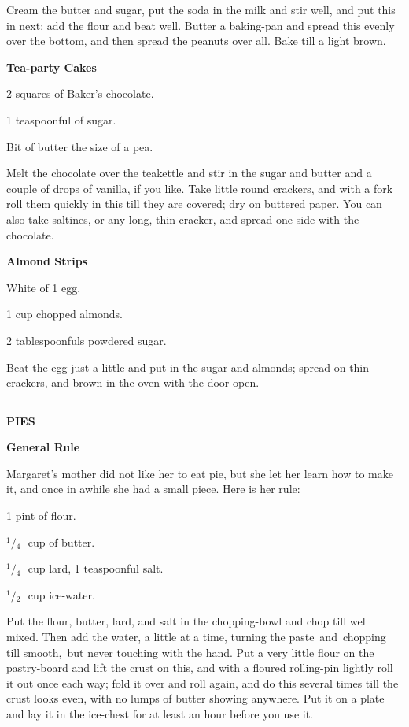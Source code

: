 \documentclass[11pt]{book}
\newcommand{\hstroke}{\rule[0.5ex]{5.0em}{0.2ex}}
\newcommand{\indpar}{\par\noindent\hspace*{\parindent}}
\newcommand{\ingredient}{\indpar}
\newcommand{\instruction}{\indpar}
\newcommand{\OneHalf}{\ensuremath{{}^1\!\!/\!{}_2\mbox{\ }}}
\newcommand{\OneQuarter}{\ensuremath{{}^1\!\!/\!{}_4\mbox{\ }}}
\newenvironment{RecipeTitle}{\medskip\begin{center}\large\bf }{\end{center}\smallskip}
\newenvironment{FoodTypeTitle}{\begin{center}\large\bf }{\end{center}}
\begin{document}
\instruction  Cream the butter and sugar, put the soda in the milk and
stir well, and put this in next; add the flour and beat well.
Butter a baking-pan and spread this evenly over the bottom,
and then spread the peanuts over all.  Bake till a light
brown.
\begin{RecipeTitle}
Tea-party Cakes\label{tea_party_cakes}
\end{RecipeTitle}
\ingredient  2 squares of Baker's chocolate.
\ingredient  1 teaspoonful of sugar.
\ingredient  Bit of butter the size of a pea.
\instruction  Melt the chocolate over the teakettle and stir in the sugar
and butter and a couple of drops of vanilla, if you like.
Take little round crackers, and with a fork roll them quickly
in this till they are covered; dry on buttered paper.  You can
also take saltines, or any long, thin  cracker, and spread one
side with the chocolate.
\begin{RecipeTitle}
Almond Strips\label{almond_strips}
\end{RecipeTitle}
\ingredient  White of 1 egg.
\ingredient  1 cup chopped almonds.
\ingredient  2 tablespoonfuls powdered sugar.
\instruction  Beat the egg just a little and put in the sugar and almonds;
spread on thin crackers, and brown in the oven with the door
open.
\bigskip
\begin{center}
\hstroke
\end{center}
\begin{FoodTypeTitle}
PIES\label{PIES}
\end{FoodTypeTitle}
\begin{RecipeTitle}
General Rule\label{pies_general_rule}
\end{RecipeTitle}
\indpar
  Margaret's mother did not like her to eat pie, but she let
her learn how to make it, and once in awhile she had a small
piece.  Here is her rule:
\ingredient  1 pint of flour.
\ingredient  \OneQuarter cup of butter.
\ingredient  \OneQuarter cup lard, 1 teaspoonful salt.
\ingredient  \OneHalf cup ice-water.
\instruction  Put the flour, butter, lard, and salt in the chopping-bowl
and chop till well mixed.  Then add the water, a little at a
time, turning the paste\, and\, chopping\, till smooth,\, but never
touching with the hand.  Put a very little flour on the
pastry-board and lift the crust on this, and with a floured
rolling-pin lightly roll it out once each way; fold it over
and roll again, and do this several times till the crust looks
even, with no lumps of butter showing anywhere.  Put it on a
plate and lay it in the ice-chest for at least an hour before
you use it.
\end{document}
